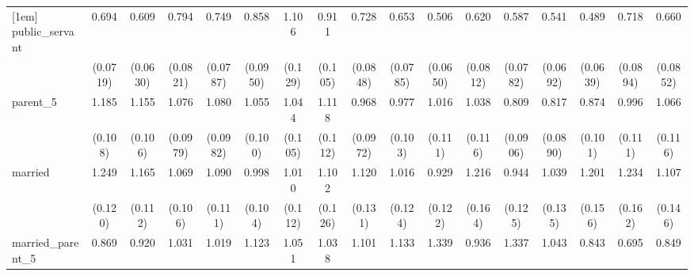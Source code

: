 {\begin{tabular}{l*{16}{c}}
[1em]
public\_servant      &       0.694\sym{***}&       0.609\sym{***}&       0.794\sym{*}  &       0.749\sym{**} &       0.858         &       1.106         &       0.911         &       0.728\sym{**} &       0.653\sym{***}&       0.506\sym{***}&       0.620\sym{***}&       0.587\sym{***}&       0.541\sym{***}&       0.489\sym{***}&       0.718\sym{**} &       0.660\sym{**} \\
                    &    (0.0719)         &    (0.0630)         &    (0.0821)         &    (0.0787)         &    (0.0950)         &     (0.129)         &     (0.105)         &    (0.0848)         &    (0.0785)         &    (0.0650)         &    (0.0812)         &    (0.0782)         &    (0.0692)         &    (0.0639)         &    (0.0894)         &    (0.0852)         \\
[1em]
parent\_5            &       1.185         &       1.155         &       1.076         &       1.080         &       1.055         &       1.044         &       1.118         &       0.968         &       0.977         &       1.016         &       1.038         &       0.809         &       0.817         &       0.874         &       0.996         &       1.066         \\
                    &     (0.108)         &     (0.106)         &    (0.0979)         &    (0.0982)         &     (0.100)         &     (0.105)         &     (0.112)         &    (0.0972)         &     (0.103)         &     (0.111)         &     (0.116)         &    (0.0906)         &    (0.0890)         &     (0.101)         &     (0.111)         &     (0.116)         \\
[1em]
married             &       1.249\sym{*}  &       1.165         &       1.069         &       1.090         &       0.998         &       1.010         &       1.102         &       1.120         &       1.016         &       0.929         &       1.216         &       0.944         &       1.039         &       1.201         &       1.234         &       1.107         \\
                    &     (0.120)         &     (0.112)         &     (0.106)         &     (0.111)         &     (0.104)         &     (0.112)         &     (0.126)         &     (0.131)         &     (0.124)         &     (0.122)         &     (0.164)         &     (0.125)         &     (0.135)         &     (0.156)         &     (0.162)         &     (0.146)         \\
[1em]
married\_parent\_5    &       0.869         &       0.920         &       1.031         &       1.019         &       1.123         &       1.051         &       1.038         &       1.101         &       1.133         &       1.339         &       0.936         &       1.337         &       1.043         &       0.843         &       0.695\sym{*}  &       0.849         \\

\end{tabular}}
